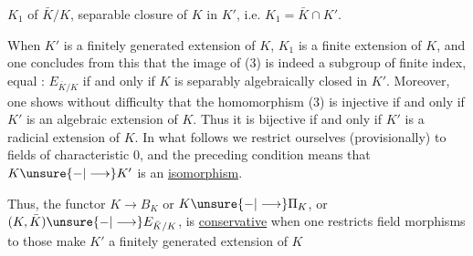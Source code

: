 $K_1$ of $\bar K/K$, separable  closure of $K$ in $K'$, i.e. $K_1=\bar K\cap K'$.

When $K'$ is a finitely generated extension of $K$, $K_1$ is a finite extension of $K$, and one concludes from this that the image of (3) is indeed a subgroup of finite index, equal : $E_{\bar K/K}$ if and only if  $K$ is separably algebraically closed in $K'$. Moreover, one shows without difficulty that  the homomorphism (3) is injective if and only if $K'$ is an algebraic extension of $K$. Thus it is bijective if and only if $K'$ is a radicial extension of $K$. In what follows we restrict ourselves (provisionally) to fields of characteristic $0$, and the preceding condition means  that $K\unsure{-|\longrightarrow}K'$ is an \uline{isomorphism}.

Thus, the functor $K\longrightarrow B_K$ or $K\unsure{-|\longrightarrow}\Pi_K$, or $(K,\bar K)\unsure{-|\longrightarrow}E_{\bar K/K}$, is \uline{conservative} when one restricts field morphisms  to those   make $K'$ a finitely generated extension of $K$
